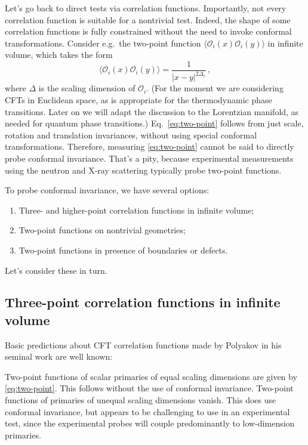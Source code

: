 \documentclass[a4paper,11pt]{article}
\newcommand{\beq}{\begin{equation}}
\newcommand{\eeq}{\end{equation}}
\theoremstyle{remark}
\theoremstyle{theorem}
\begin{document}
Let's go back to direct tests via correlation functions. Importantly, not every correlation function is suitable for a nontrivial test. Indeed, the shape of some correlation functions is fully constrained without the need to invoke conformal transformations.  Consider e.g.~the two-point function $\langle \mathcal{O}_i(x) \mathcal{O}_i(y)\rangle$ in infinite volume, which takes the form
\beq
\langle \mathcal{O}_i(x) \mathcal{O}_i(y)\rangle = \frac{1}{|x-y|^{2\Delta_i}}\,,
\label{eq:two-point}
\eeq
where $\Delta$ is the scaling dimension of $\mathcal{O}_i$. (For the moment we are considering CFTs in Euclidean space, as is appropriate for the thermodynamic phase transitions. Later on we will adapt the discussion to the Lorentzian manifold, as needed for quantum phase transitions.) Eq.~\eqref{eq:two-point} follows from just scale, rotation and translation invariances, without using special conformal transformations. Therefore, measuring \eqref{eq:two-point} cannot be said to directly probe conformal invariance. That's a pity, because experimental measurements using the neutron and X-ray scattering typically probe two-point functions.

To probe conformal invariance, we have several options:
\begin{enumerate}
	\item Three- and higher-point correlation functions in infinite volume;
	\item Two-point functions on nontrivial geometries;
	\item Two-point functions in presence of boundaries or defects.
\end{enumerate}
Let's consider these in turn.

\subsection{Three-point correlation functions in infinite volume}

Basic predictions about CFT correlation functions made by Polyakov in his seminal work \cite{} are well known:

Two-point functions of scalar primaries of equal scaling dimensions are given by \eqref{eq:two-point}. This follows without the use of conformal invariance. Two-point functions of primaries of unequal scaling dimensions vanish. This does use conformal invariance, but appears to be challenging to use in an experimental test, since the experimental probes will couple predominantly to low-dimension primaries.
\end{document}
